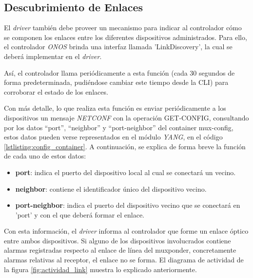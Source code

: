 \subsection{Descubrimiento de Enlaces}

El \textit{driver} también debe proveer un mecanismo para indicar al controlador cómo se componen los enlaces entre los diferentes dispositivos administrados. Para ello, el controlador \textit{ONOS} brinda una interfaz llamada 'LinkDiscovery', la cual se deberá implementar en el \textit{driver}. 

Así, el controlador llama periódicamente a esta función (cada 30 segundos de forma predeterminada, pudiéndose cambiar este tiempo desde la CLI) para corroborar el estado de los enlaces. 

Con más detalle, lo que realiza esta función es enviar periódicamente a los dispositivos un mensaje \textit{NETCONF} con la operación GET-CONFIG, consultando por los datos “port”, “neighbor” y “port-neighbor” del container mux-config, estos datos pueden verse representados en el módulo \textit{YANG}, en el código \ref{lstlisting:config_container}. A continuación, se explica de forma breve la función de cada uno de estos datos:

\begin{itemize}
	\item \textbf{port}: indica el puerto del dispositivo local al cual se conectará un vecino.
    
    \item \textbf{neighbor}: contiene el identificador único del dispositivo vecino.
    
    \item \textbf{port-neighbor}: indica el puerto del dispositivo vecino que se conectará en 'port' y con el que deberá formar el enlace.
\end{itemize}

Con esta información, el \textit{driver} informa al controlador que forme un enlace óptico entre ambos dispositivos. Si alguno de los dispositivos involucrados contiene alarmas registradas respecto al enlace de línea del muxponder, concretamente alarmas relativas al receptor, el enlace no se forma. El diagrama de actividad de la figura \ref{fig:actividad_link} muestra lo explicado anteriormente.


